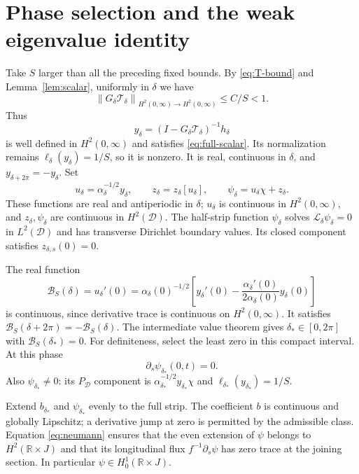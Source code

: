 \documentclass[11pt,a4paper]{article}
\newcommand{\R}{\mathbb R}
\newcommand{\D}{\mathcal D}
\newcommand{\Lop}{\mathcal L}
\newcommand{\Tcal}{\mathcal T}
\newcommand{\norm}[1]{\left\lVert#1\right\rVert}
\begin{document}
\section{Phase selection and the weak eigenvalue identity}

Take $S$ larger than all the preceding fixed bounds.
By \eqref{eq:T-bound} and Lemma~\ref{lem:scalar},
uniformly in $\delta$ we have
\[
 \norm{G_\delta\Tcal_\delta}_{H^2(0,\infty)\to H^2(0,\infty)}
 \le C/S<1.
\]
Thus
\begin{equation}\label{eq:final-fixedpoint}
 y_\delta=(I-G_\delta\Tcal_\delta)^{-1}h_\delta
\end{equation}
is well defined in $H^2(0,\infty)$ and satisfies \eqref{eq:full-scalar}.
Its normalization remains $\ell_\delta(y_\delta)=1/S$, so it is nonzero.
It is real, continuous in $\delta$, and $y_{\delta+2\pi}=-y_\delta$.
Set
\[
 u_\delta=\alpha_\delta^{-1/2}y_\delta,\qquad
 z_\delta=z_\delta[u_\delta],\qquad
 \psi_\delta=u_\delta\chi+z_\delta.
\]
These functions are real and antiperiodic in $\delta$;
$u_\delta$ is continuous in $H^2(0,\infty)$, and $z_\delta,\psi_\delta$
are continuous in $H^2(\D)$. The half-strip function $\psi_\delta$ solves
$\Lop_\delta\psi_\delta=0$ in $L^2(\D)$ and has transverse Dirichlet
boundary values. Its closed component satisfies $z_{\delta,s}(0)=0$.

The real function
\begin{equation}\label{eq:phase-functional}
 \mathcal B_S(\delta)=u_\delta'(0)
 =\alpha_\delta(0)^{-1/2}
   \left[y_\delta'(0)
       -\frac{\alpha_\delta'(0)}{2\alpha_\delta(0)}y_\delta(0)\right]
\end{equation}
is continuous, since derivative trace is continuous on $H^2(0,\infty)$.
It satisfies $\mathcal B_S(\delta+2\pi)=-\mathcal B_S(\delta)$.
The intermediate value theorem gives $\delta_*\in[0,2\pi]$ with
$\mathcal B_S(\delta_*)=0$. For definiteness, select the least zero in
this compact interval. At this phase
\begin{equation}\label{eq:neumann}
 \partial_s\psi_{\delta_*}(0,t)=0.
\end{equation}
Also $\psi_{\delta_*}\ne0$: its $P_{\D}$ component is
$\alpha_{\delta_*}^{-1/2}y_{\delta_*}\chi$ and
$\ell_{\delta_*}(y_{\delta_*})=1/S$.

Extend $b_{\delta_*}$ and $\psi_{\delta_*}$ evenly to the full strip.
The coefficient $b$ is continuous and globally Lipschitz; a derivative
jump at zero is permitted by the admissible class.
Equation \eqref{eq:neumann} ensures that the even extension of $\psi$
belongs to $H^2(\R\times J)$ and that its longitudinal flux
$f^{-1}\partial_s\psi$ has zero trace at the joining section.
In particular $\psi\in H_0^1(\R\times J)$.
\end{document}
